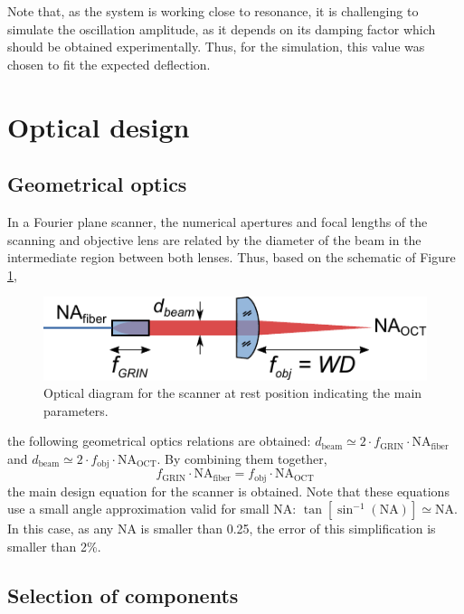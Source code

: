 \documentclass[10pt]{iopart}
\begin{document}
Note that, as the system is working close to resonance, it is challenging to simulate the oscillation amplitude, as it depends on its damping factor which should be obtained experimentally. Thus, for the simulation, this value was chosen to fit the expected deflection. 



\section{Optical design}

\subsection{Geometrical optics}
In a Fourier plane scanner, the numerical apertures and focal lengths of the scanning and objective lens are related by the diameter of the beam in the intermediate region between both lenses. Thus, based on the schematic of Figure \ref{fig:opticsParam}, 
\begin{figure}[h]\centering
      \includegraphics{figures/opticsParam.pdf}
      \caption{Optical diagram for the scanner at rest position indicating the main parameters.}
      \label{fig:opticsParam}
\end{figure}
the following geometrical optics relations are obtained: $d_\mathrm{beam} \simeq 2\cdot f_\mathrm{GRIN}\cdot \mathrm{NA}_\mathrm{fiber}$ and $d_\mathrm{beam} \simeq 2 \cdot f_\mathrm{obj}\cdot \mathrm{NA}_\mathrm{OCT}$. By combining them together,
\begin{equation}
f_\mathrm{GRIN} \cdot \mathrm{NA}_\mathrm{fiber} = f_\mathrm{obj} \cdot \mathrm{NA}_\mathrm{OCT}
\label{eq:fpsNA}
\end{equation}
the main design equation for the scanner is obtained. Note that these equations use a small angle approximation valid for small NA:  $\tan[\sin^{-1}(\mathrm{NA})] \simeq \mathrm{NA} $. In this case, as any NA is smaller than 0.25, the error of this simplification is smaller than 2\%.

\subsection{Selection of components}
\end{document}
